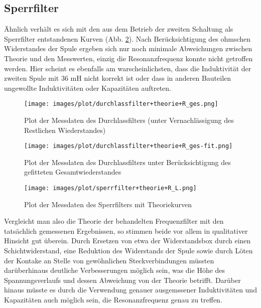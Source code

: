 \subsection{Sperrfilter}
Ähnlich verhält es sich mit den aus dem Betrieb der zweiten Schaltung als Sperrfilter entstandenen Kurven (Abb. \ref{plot:sperr}). Nach Berücksichtigung des ohmschen Widerstandes der Spule ergeben sich nur noch minimale Abweichungen zwischen Theorie und den Messwerten, einzig die Resonanzfrequenz konnte nicht getroffen werden. Hier scheint es ebenfalls am warscheinlichsten, dass die Induktivität der zweiten Spule mit 36 mH nicht korrekt ist oder dass in anderen Bauteilen ungewollte Induktivitäten oder Kapazitäten auftreten.
\begin{figure}
        \texttt{[image: images/plot/durchlassfilter+theorie+R\_ges.png]}
\caption{Plot der Messdaten des Durchlassfilters (unter Vernachlässigung des Restlichen Wiederstandes)}
\label{plot:durchlass+R_ges}

	\texttt{[image: images/plot/durchlassfilter+theorie+R\_ges-fit.png]}
\caption{Plot der Messdaten des Durchlassfilters unter Berücksichtigung des gefitteten Gesamtwiederstandes}
\label{plot:durchlass+R_ges-fit}
\end{figure}
\begin{figure}
        \texttt{[image: images/plot/sperrfilter+theorie+R\_L.png]}
\caption{Plot der Messdaten des Sperrfilters mit Theoriekurven}
\label{plot:sperr}
\end{figure}
Vergleicht man also die Theorie der behandelten Frequenzfilter mit den tatsächlich gemessenen Ergebnissen, so stimmen beide vor allem in qualitativer Hinsicht gut überein. Durch Ersetzen von etwa der Widerstandsbox durch einen Schichtwiderstand, eine Reduktion des Widerstands der Spule sowie durch Löten der Kontake an Stelle von gewöhnlichen Steckverbindungen müssten darüberhinaus deutliche Verbesserungen möglich sein, was die Höhe des Spannungsverlaufs und dessen Abweichung von der Theorie betrifft. 
Darüber hinaus müsste es durch die Verwendung genauer ausgemssener Induktivitäten und Kapazitäten auch möglich sein, die Resonanzfrequenz genau zu treffen. 
